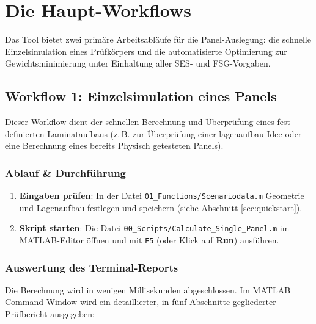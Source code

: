\chapter{Die Haupt-Workflows} \label{ch:workflows}

Das Tool bietet zwei primäre Arbeitsabläufe für die Panel-Auslegung: die schnelle Einzelsimulation eines Prüfkörpers und die automatisierte Optimierung zur Gewichtsminimierung unter Einhaltung aller SES- und FSG-Vorgaben.

\section{Workflow 1: Einzelsimulation eines Panels} \label{sec:calc_single_panel}

Dieser Workflow dient der schnellen Berechnung und Überprüfung eines fest definierten Laminataufbaus (z.\,B. zur Überprüfung einer lagenaufbau Idee oder eine Berechnung eines bereits Physisch getesteten Panels).

\subsection*{Ablauf \& Durchführung}
\begin{enumerate}
    \item \textbf{Eingaben prüfen}: In der Datei \texttt{01\_Functions/Scenariodata.m} Geometrie und Lagenaufbau festlegen und speichern (siehe Abschnitt \ref{sec:quickstart}).
    \item \textbf{Skript starten}: Die Datei \texttt{00\_Scripts/Calculate\_Single\_Panel.m} im MATLAB-Editor öffnen und mit \texttt{F5} (oder Klick auf \textbf{Run}) ausführen.
\end{enumerate}

\subsection*{Auswertung des Terminal-Reports}
Die Berechnung wird in wenigen Millisekunden abgeschlossen. Im MATLAB Command Window wird ein detaillierter, in fünf Abschnitte gegliederter Prüfbericht ausgegeben:

